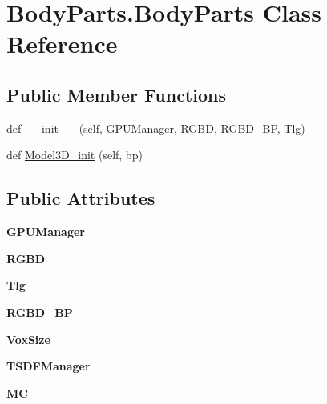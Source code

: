 \hypertarget{class_body_parts_1_1_body_parts}{}\section{Body\+Parts.\+Body\+Parts Class Reference}
\label{class_body_parts_1_1_body_parts}
\subsection*{Public Member Functions}
\begin{DoxyCompactItemize}
\item 
def \hyperlink{class_body_parts_1_1_body_parts_a1d480c13f6791c93e0da18d6da99a785}{\+\_\+\+\_\+init\+\_\+\+\_\+} (self, G\+P\+U\+Manager, R\+G\+BD, R\+G\+B\+D\+\_\+\+BP, Tlg)
\item 
def \hyperlink{class_body_parts_1_1_body_parts_a42e88badcb71b203213ef853ff7aa291}{Model3\+D\+\_\+init} (self, bp)
\end{DoxyCompactItemize}
\subsection*{Public Attributes}
\begin{DoxyCompactItemize}
\item 
\mbox{\label{class_body_parts_1_1_body_parts_ab3a2fc59ff473104c3f51a2f3f9c5010}} 
{\bfseries G\+P\+U\+Manager}
\item 
\mbox{\label{class_body_parts_1_1_body_parts_ac1812d58953dcb8afbc9e1f3265e7ca4}} 
{\bfseries R\+G\+BD}
\item 
\mbox{\label{class_body_parts_1_1_body_parts_a39bad48cedf4b87ed875975ff13bd642}} 
{\bfseries Tlg}
\item 
\mbox{\label{class_body_parts_1_1_body_parts_a7f470c49a980e43e653f020e62ab7365}} 
{\bfseries R\+G\+B\+D\+\_\+\+BP}
\item 
\mbox{\label{class_body_parts_1_1_body_parts_ab1441a0be27dc35510f8ab0d450a5059}} 
{\bfseries Vox\+Size}
\item 
\mbox{\label{class_body_parts_1_1_body_parts_afbbad8811acdf0e0ecaf8f2a62b5e00d}} 
{\bfseries T\+S\+D\+F\+Manager}
\item 
\mbox{\label{class_body_parts_1_1_body_parts_a461ad5d0d38ec1e94a0162f4f560f3c3}} 
{\bfseries MC}
\end{DoxyCompactItemize}


